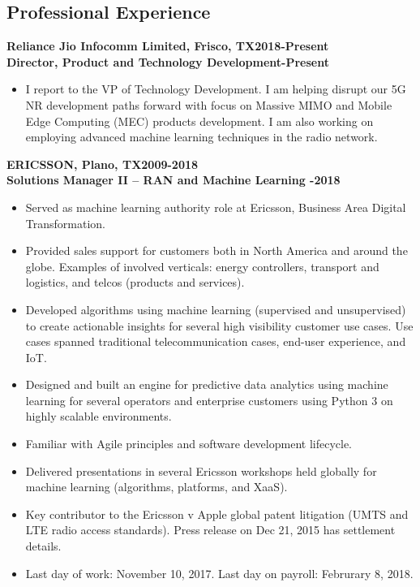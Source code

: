 \documentclass{article}
\begin{document}
\subsection*{\sc \centering Professional Experience}
\textbf{Reliance Jio Infocomm Limited, Frisco, TX\hfill 2018-Present}\\
\textbf{Director, Product and Technology Development\hfill {}-Present}
\begin{itemize}
\item I report to the VP of Technology Development. I am helping disrupt our 5G NR development paths forward with focus on Massive MIMO and Mobile Edge Computing (MEC) products development. I am also working on employing advanced machine learning techniques in the radio network.
\end{itemize}
\textbf{ERICSSON, Plano, TX\hfill 2009-2018}\\
\textbf{Solutions Manager II -- RAN and Machine Learning \hfill{}-2018}
\begin{itemize}
\item Served as machine learning authority role at Ericsson, Business Area Digital Transformation. 
\item Provided sales support for customers both in North America and around the globe. Examples of involved verticals: energy controllers, transport and logistics, and telcos (products and services).
\item Developed algorithms using machine learning (supervised and unsupervised) to create actionable insights for several high visibility customer use cases. Use cases spanned traditional telecommunication cases, end-user experience, and IoT. 
\item Designed and built an engine for predictive data analytics using machine learning for several operators and enterprise customers using Python 3 on highly scalable environments.%
\item Familiar with Agile principles and software development lifecycle.
\item Delivered presentations in several Ericsson workshops held globally for machine learning (algorithms, platforms, and XaaS). 
\item Key contributor to the Ericsson v Apple global patent litigation (UMTS and LTE radio access standards). Press release on Dec 21, 2015 has settlement details.
\item Last day of work: November 10, 2017.  Last day on payroll: Februrary 8, 2018.
\end{itemize}
\end{document}
